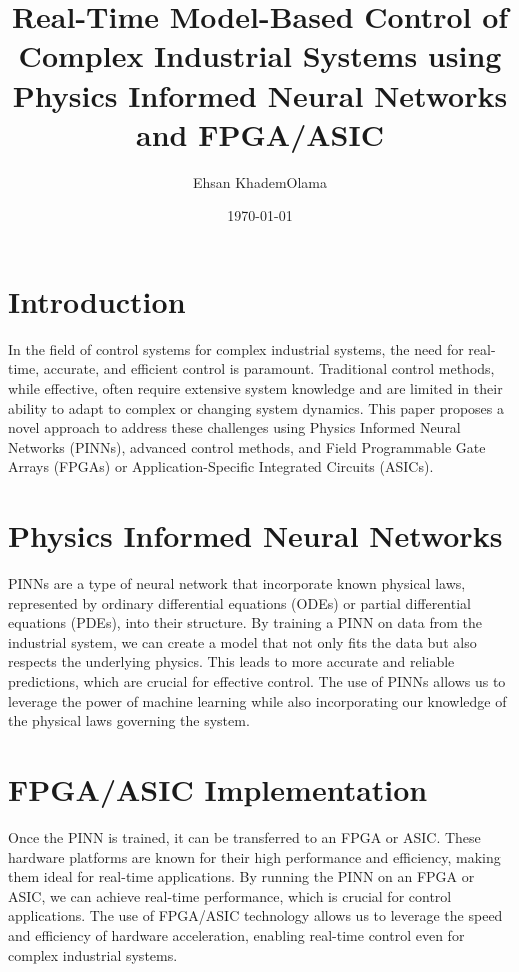 \documentclass{article}
\title{Real-Time Model-Based Control of Complex Industrial Systems using Physics Informed Neural Networks and FPGA/ASIC}
\author{Ehsan KhademOlama}
\date{\today}
\begin{document}
	
	\maketitle
	
	\section{Introduction}
	
	In the field of control systems for complex industrial systems, the need for real-time, accurate, and efficient control is paramount. Traditional control methods, while effective, often require extensive system knowledge and are limited in their ability to adapt to complex or changing system dynamics. This paper proposes a novel approach to address these challenges using Physics Informed Neural Networks (PINNs), advanced control methods, and Field Programmable Gate Arrays (FPGAs) or Application-Specific Integrated Circuits (ASICs).
	
	\section{Physics Informed Neural Networks}
	
	PINNs are a type of neural network that incorporate known physical laws, represented by ordinary differential equations (ODEs) or partial differential equations (PDEs), into their structure. By training a PINN on data from the industrial system, we can create a model that not only fits the data but also respects the underlying physics. This leads to more accurate and reliable predictions, which are crucial for effective control. The use of PINNs allows us to leverage the power of machine learning while also incorporating our knowledge of the physical laws governing the system.
	
	\section{FPGA/ASIC Implementation}
	
	Once the PINN is trained, it can be transferred to an FPGA or ASIC. These hardware platforms are known for their high performance and efficiency, making them ideal for real-time applications. By running the PINN on an FPGA or ASIC, we can achieve real-time performance, which is crucial for control applications. The use of FPGA/ASIC technology allows us to leverage the speed and efficiency of hardware acceleration, enabling real-time control even for complex industrial systems.
	
\end{document}
